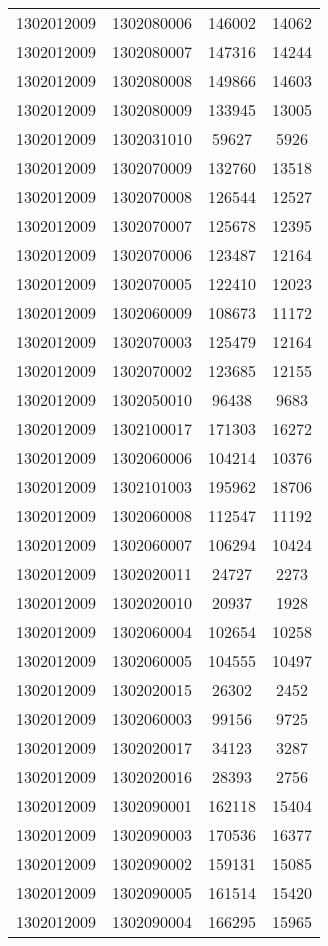 \begin{longtable}{llcc}
1302012009 & 1302080006 & 146002 & 14062\\
1302012009 & 1302080007 & 147316 & 14244\\
1302012009 & 1302080008 & 149866 & 14603\\
1302012009 & 1302080009 & 133945 & 13005\\
1302012009 & 1302031010 & 59627 & 5926\\
1302012009 & 1302070009 & 132760 & 13518\\
1302012009 & 1302070008 & 126544 & 12527\\
1302012009 & 1302070007 & 125678 & 12395\\
1302012009 & 1302070006 & 123487 & 12164\\
1302012009 & 1302070005 & 122410 & 12023\\
1302012009 & 1302060009 & 108673 & 11172\\
1302012009 & 1302070003 & 125479 & 12164\\
1302012009 & 1302070002 & 123685 & 12155\\
1302012009 & 1302050010 & 96438 & 9683\\
1302012009 & 1302100017 & 171303 & 16272\\
1302012009 & 1302060006 & 104214 & 10376\\
1302012009 & 1302101003 & 195962 & 18706\\
1302012009 & 1302060008 & 112547 & 11192\\
1302012009 & 1302060007 & 106294 & 10424\\
1302012009 & 1302020011 & 24727 & 2273\\
1302012009 & 1302020010 & 20937 & 1928\\
1302012009 & 1302060004 & 102654 & 10258\\
1302012009 & 1302060005 & 104555 & 10497\\
1302012009 & 1302020015 & 26302 & 2452\\
1302012009 & 1302060003 & 99156 & 9725\\
1302012009 & 1302020017 & 34123 & 3287\\
1302012009 & 1302020016 & 28393 & 2756\\
1302012009 & 1302090001 & 162118 & 15404\\
1302012009 & 1302090003 & 170536 & 16377\\
1302012009 & 1302090002 & 159131 & 15085\\
1302012009 & 1302090005 & 161514 & 15420\\
1302012009 & 1302090004 & 166295 & 15965\\

\end{longtable}
